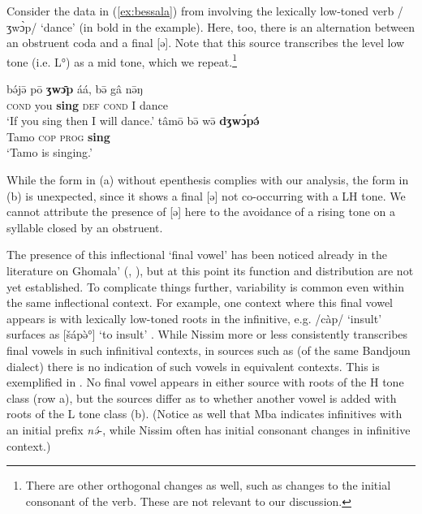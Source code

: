 \documentclass[output=paper,colorlinks,citecolor=brown,draft,draftmode]{langscibook}
\begin{document}
Consider the data in (\ref{ex:bessala}) from \citet{bessala2017}  involving the lexically low-toned verb /ʒw\`ɔp/ `dance' (in bold in the example).
Here, too, there is an alternation between an obstruent coda and a final [ə].
Note that this source transcribes the level low tone (i.e. L°) as a mid tone, which we repeat.\footnote{There are other orthogonal changes as well, such as changes to the initial consonant of the verb. These are not relevant to our discussion.}

\begin{exe}
	\ex \label{ex:bessala}
        \begin{xlist}
            \ex \gll 		    bə́jə̄ pō \textbf{ʒwɔ̄p} áá, bə̄ gâ nə̄ŋ \\
            \textsc{cond} you \textbf{sing} \textsc{def} \textsc{cond} I dance\\
             \glt `If you sing then I will dance.' \citep[153]{bessala2017}
            \ex \gll 	tâmō bə̄ wə̄ \textbf{dʒwɔ́pə́} \\
            Tamo \textsc{cop}  \textsc{prog}  \textbf{sing}\\
            \glt `Tamo is singing.' \citep[151]{bessala2017}
        \end{xlist}
\end{exe}

\noindent While the form in (a) without epenthesis complies with our  analysis, the form in (b) is unexpected, since it shows a final [ə] not co-occurring with a LH tone. We cannot attribute the presence of [ə] here to the avoidance of a rising tone on a syllable closed by an obstruent. 

The presence of this inflectional `final vowel' has been noticed already in the literature on Ghomala'  (\citealt{bessala2017}, \citealt[100]{kamdem2020}),
but at this point its  function and distribution are not yet established. 
To complicate things further, variability is common even within the same inflectional context.
For example, one context where this final vowel appears is with lexically low-toned roots in the infinitive, e.g. /càp/ `insult' surfaces as [šápə̀°]
`to insult' \citep[77]{nissim1972}.
While  Nissim more or less consistently transcribes final vowels in such infinitival contexts, in  sources such as \citet{mba1997} (of the same Bandjoun dialect) there is no indication of such vowels in equivalent contexts.
This is exemplified in .
No final vowel appears in either source with roots of the H tone class (row a), but the sources differ as to whether another vowel is added with roots of the L tone class (b). (Notice as well that Mba  indicates infinitives with an initial prefix \textit{n\'ə}-, while Nissim often has initial consonant changes in infinitive context.)
\end{document}
